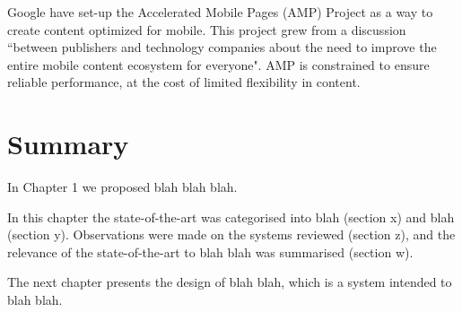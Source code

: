 Google have set-up the Accelerated Mobile Pages (AMP) Project as a way to create content optimized for mobile. This project grew from a discussion ``between publishers and technology companies about the need to improve the entire mobile content ecosystem for everyone". AMP is constrained to ensure reliable performance, at the cost of limited flexibility in content. \cite{intro_to_amp}

\section{Summary} \label{l-r--summary}

In Chapter 1 we proposed blah blah blah.

In this chapter the state-of-the-art was categorised into blah (section x) and  blah (section y).  Observations were made on the systems reviewed (section z), and the relevance of the state-of-the-art to blah blah was summarised (section w).

The next chapter presents the design of blah blah, which is a system intended to blah blah.
